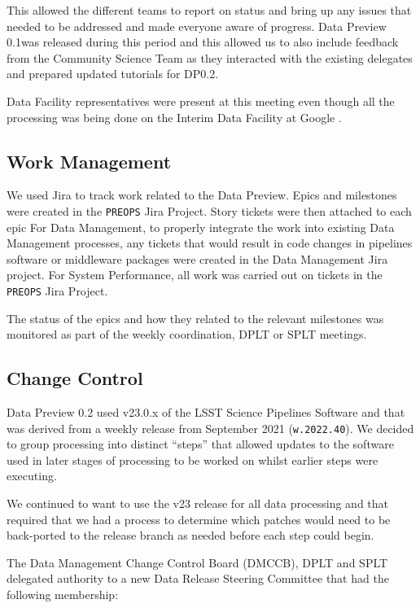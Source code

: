 This allowed the different teams to report on status and bring up any issues that needed to be addressed and made everyone aware of progress.
Data Preview 0.1was released during this period and this allowed us to also include feedback from the Community Science Team as they interacted with the existing delegates and prepared updated tutorials for DP0.2.

Data Facility representatives were present at this meeting even though all the processing was being done on the Interim Data Facility at Google \citep{2021arXiv211115030O}.

\subsection{Work Management}

We used Jira to track work related to the Data Preview.
Epics and milestones were created in the \texttt{PREOPS} Jira Project.
Story tickets were then attached to each epic 
For Data Management, to properly integrate the work into existing Data Management processes, any tickets that would result in code changes in pipelines software or middleware packages were created in the Data Management Jira project.
For System Performance, all work was carried out on tickets in the  \texttt{PREOPS} Jira Project.

The status of the epics and how they related to the relevant milestones was monitored as part of the weekly coordination, DPLT or SPLT meetings.

\subsection{Change Control}

Data Preview 0.2 used v23.0.x of the LSST Science Pipelines Software and that was derived from a weekly release from September 2021 (\texttt{w.2022.40}).
We decided to group processing into distinct ``steps'' that allowed updates to the software used in later stages of processing to be worked on whilst earlier steps were executing.

We continued to want to use the v23 release for all data processing and that required that we had a process to determine which patches would need to be back-ported to the release branch as needed before each step could begin.

The Data Management Change Control Board (DMCCB), DPLT and SPLT  delegated authority to a new Data Release Steering Committee that had the following membership:

